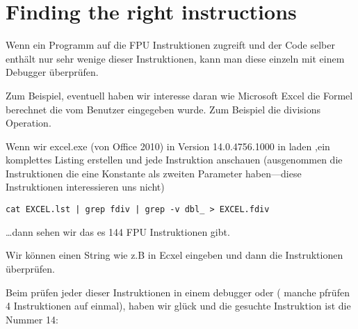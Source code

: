 \section{Finding the right instructions}

Wenn ein Programm auf die FPU Instruktionen zugreift und der Code selber enthält nur sehr wenige
dieser Instruktionen, kann man diese einzeln mit einem Debugger überprüfen.


\par Zum Beispiel, eventuell haben wir interesse daran wie Microsoft Excel die Formel berechnet die vom Benutzer eingegeben wurde.
Zum Beispiel die divisions Operation.


\myindex{\GrepUsage}

Wenn wir excel.exe (von Office 2010) in Version 14.0.4756.1000 in \IDA laden ,ein komplettes
Listing erstellen und jede \FDIV Instruktion anschauen (ausgenommen die Instruktionen die
eine Konstante als zweiten Parameter haben---diese Instruktionen interessieren uns nicht)


\begin{lstlisting}
cat EXCEL.lst | grep fdiv | grep -v dbl_ > EXCEL.fdiv
\end{lstlisting}

\dots dann sehen wir das es 144 FPU Instruktionen gibt.

\par Wir können einen String wie z.B  in Ecxel eingeben und dann die Instruktionen überprüfen.


\par Beim prüfen jeder dieser Instruktionen in einem debugger oder \tracer
( manche pfrüfen 4 Instruktionen auf einmal), haben wir glück und die
gesuchte Instruktion ist die Nummer 14:


